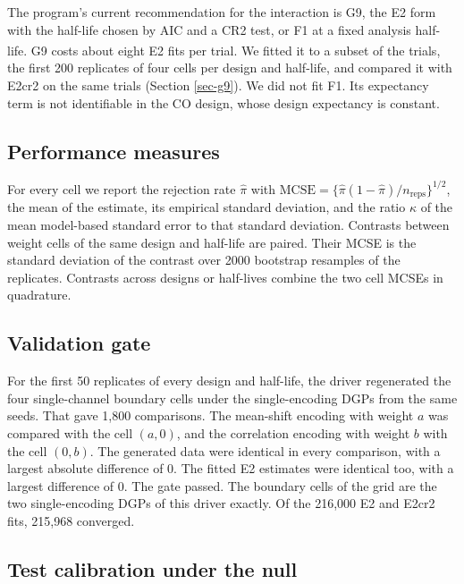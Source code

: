 \documentclass[
  11pt,
]{article}
\begin{document}
The program's current recommendation for the interaction is G9, the
E2 form with the half-life chosen by AIC and a CR2 test, or F1 at a
fixed analysis half-life\textsuperscript{}. G9 costs about eight
E2 fits per trial. We fitted it to a subset of the trials, the first
200 replicates of four cells per design and half-life, and compared it
with E2cr2 on the same trials (Section \ref{sec-g9}). We did not fit
F1. Its expectancy term is not identifiable in the CO design, whose
design expectancy is constant.

\subsection{Performance measures}\label{performance-measures}

For every cell we report the rejection rate \(\hat\pi\) with
\(\mathrm{MCSE} = \{\hat\pi(1-\hat\pi)/n_{\text{reps}}\}^{1/2}\), the mean
of the estimate, its empirical standard deviation, and the ratio
\(\kappa\) of the mean model-based standard error to that standard
deviation. Contrasts between weight cells of the same design and
half-life are paired. Their MCSE is the standard deviation of the
contrast over 2000 bootstrap resamples of the replicates. Contrasts
across designs or half-lives combine the two cell MCSEs in quadrature.

\subsection{Validation gate}\label{sec-gate}

For the first 50 replicates of every design and
half-life, the driver regenerated the four single-channel boundary
cells under the single-encoding DGPs from the same seeds. That gave
1,800 comparisons. The mean-shift
encoding with weight \(a\) was compared with the cell \((a, 0)\), and the
correlation encoding with weight \(b\) with the cell \((0, b)\). The
generated data were identical in every comparison, with a largest
absolute difference of 0.
The fitted E2 estimates were identical too, with a largest difference
of 0. The
gate passed. The boundary cells of the grid are the two single-encoding
DGPs of this driver exactly. Of the 216,000
E2 and E2cr2 fits, 215,968 converged.

\subsection{Test calibration under the null}\label{test-calibration-under-the-null}
\end{document}
